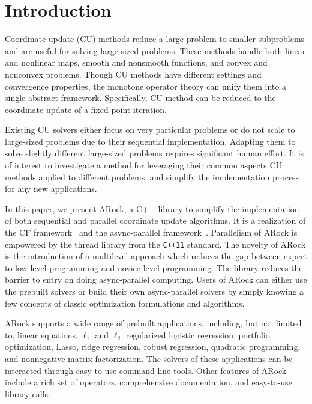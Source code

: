 \section{Introduction}
Coordinate update (CU) methods reduce a large problem to smaller subproblems and are useful for solving large-sized problems.
These methods handle both linear and nonlinear maps, smooth and nonsmooth functions, and convex and nonconvex problems. 
Though CU methods have different settings and convergence properties,  the monotone operator theory can unify them into a single abstract framework. 
Specifically, CU method can be reduced to the coordinate update of a fixed-point iteration. 

Existing CU solvers \citep{hsieh2015passcode,jaggi2014communication,recht2011hogwild} either focus on very particular problems or do not scale to large-sized problems due to their sequential implementation. 
Adapting them to solve slightly different large-sized problems requires significant human effort. 
It is of interest to investigate a method for leveraging their common aspects CU methods applied to different problems, and simplify the implementation process for any new applications. 

In this paper, we present ARock, a C++ library to simplify the implementation of both sequential and parallel coordinate update algorithms. It is a realization of the CF framework~\citep{peng2016coordinate} and the async-parallel framework~\citep{peng2015arock}. Parallelism of ARock is empowered by the thread library from the \texttt{C++11} standard. The novelty of ARock is the introduction of a multilevel approach which reduces the gap between expert to low-level programming and novice-level programming.
The library reduces the barrier to entry on doing async-parallel computing. 
Users of ARock can either use the prebuilt solvers or build their own async-parallel solvers by simply knowing a few concepts of classic optimization formulations and algorithms.

ARock supports a wide range of prebuilt applications, including, but not limited to, 
linear equations, $\ell_1$ and $\ell_2$ regularized logistic regression, portfolio optimization, 
Lasso, ridge regression, robust regression, quadratic programming, and nonnegative matrix factorization. 
The solvers of these applications can be interacted through easy-to-use command-line tools. 
Other features of ARock include a rich set of operators, comprehensive documentation, and easy-to-use library calls.